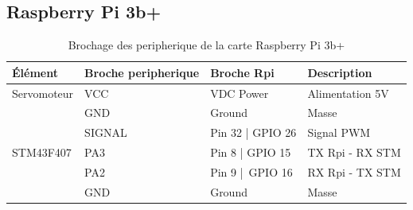 \subsection{Raspberry Pi 3b+}
\begin{table}[H]
\centering
\begin{tabular}{|l|l|l|l|}
\hline
\textbf{Élément}                & \textbf{Broche peripherique}      &\textbf{Broche Rpi}            & \textbf{Description}      \\ \hline
Servomoteur                     & VCC                               & VDC Power                     & Alimentation 5V           \\ \hline
                                & GND                               & Ground                        & Masse                     \\ \hline
                                & SIGNAL                            & Pin 32 | GPIO 26              & Signal PWM                \\ \hline
STM43F407                       & PA3                               & Pin 8  | GPIO 15              & TX Rpi - RX STM           \\ \hline
                                & PA2                               & Pin 9  | GPIO 16              & RX Rpi - TX STM           \\ \hline
                                & GND                               & Ground                        & Masse                     \\ \hline
\end{tabular}
\caption{Brochage des peripherique de la carte Raspberry Pi 3b+}
\label{tab:brochage_rpi}
\end{table}